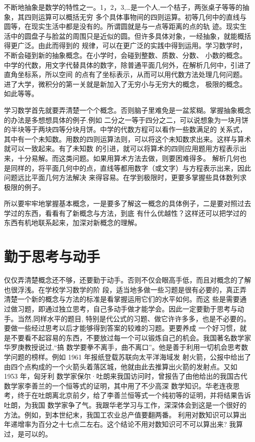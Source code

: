\documentclass[twoside,openright,headings=optiontohead]{ctexbook} %
\begin{document}
{不断地抽象是数学的特性之一。1，2，3,\ldots{}是一个人,一个桔子，两张桌子等等的抽象，其四则运算可以概括无穷
多个具体事物间的四则运算。初等几何中的直线与圆等，在现实生活中都是没有的。所谓圆就是与一点等距离的点的轨
迹。现实生活中的圆盘子与脸盆的周围只是近似的圆。但许多具体对象，一经抽象，就能概括得更广泛。由此而得到的
规律，可以在更广泛的实践中得到运用。学习数学时，不断会碰到新的抽象概念。在小学时，会碰到整数、质数、分数、
小数的概念。中学的代数，用文字代替具体的数字，除普通平面几何外，在解析几何中，引进了直角坐标系，所以空间
的点有了坐标表示，从而可以用代数方法处理几何问题。进了大学，微积分的第一关就是新加入了无穷小与无穷大的概念，
极限的概念。如此等等。

学习数学首先就要弄清楚一个个概念。否则脑子里难免是一盆浆糊。掌握抽象概念的办法是多想想具体的例子.例如
二分之一等于四分之二，可以说想象为一块月饼的半块等于两块四等分块月饼。中学的代数方程可以看作一些数满足的
关系式，其中有一个未知数。用数的四则运算法则，可以将这个未知数求出来。这样与算术就可以一致起来。有了未知数
的引进，就可以将算术的四则应用题用方程表示出来，十分易解。而这类问题。如果用算术方法去做，则要困难得多。
解析几何也是同样的，将平面几何中的点，直线等都用数字（或文字）与方程表示出来，因此问题远比平面几何方法解决
来得容易。在学到极限时，更要多掌握些具体数列求极限的例子。

所以要牢牢地掌握基本概念，一是要多了解这一概念的具体例子，二是要对照过去学过的东西，看看有了新概念与方法，到底
有什么优越性？这样还可以把学过的东西有机地联系起来，加深对新概念的理解。

\hypertarget{ux52e4ux4e8eux601dux8003ux4e0eux52a8ux624b}{%
\section*{勤于思考与动手}\label{ux52e4ux4e8eux601dux8003ux4e0eux52a8ux624b}}

仅仅弄清楚概念还不够，还要勤于动手。否则不仅会眼高手低，而且对概念的了解也很浮浅。在学校学习数学的阶
段，适当地多做一些习题是很有必要的，真正弄清楚一个新的概念与方法的标准是看掌握运用它们的水平如何。而这
些是需要通过做习题，即通过独立思考，自己多动手做才能学会。因此一定要勤于思考与动手。当然,同样水平的题目,
特别是代公式的习题、做它许许多多，也是不必要的。要做一些经过思考以后才能够得到答案的较难的习题。更要养成
一个好习惯，就是不要看不起容易的东西，不要放过每一个可以锻炼自己的机会。我国著名数学家华罗庚教授说过,``搞
数学要拳不离手，曲不离口''。他是善于利用一切机会思考数学问题的榜样。例如 1961 年报纸登载苏联向太平洋海域发
射火箭，公报中给出了由四个点构成的一个火箭头着落区城，他就由此去推算出火箭的发射点。又如 1953 年，匈牙利
数学家保尔·吐朗来我国访问时，曾报告了由他给出的我国古代数学家李善兰的一个恒等式的证明，其中用了不少高深
数学知识。华老连夜思考，终于在吐朗离北京前夕，给了李善兰恒等式一个纯初等的证明，并将结果告诉吐朗，为我国
数学家争了气。我跟华老学习与工作，深深体会到这是一个很好的方法。例如，到本世纪末，我国工农业总产值要翻两番。
利用对数知识可以算出年递增率为百分之十七点二左右。这个结论不用对数知识可不可以算出来? 我算过，是可以的。

}
\end{document}
